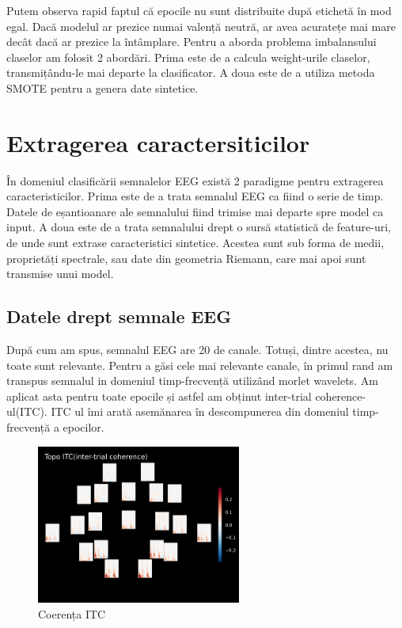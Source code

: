 Putem observa rapid faptul că epocile nu sunt distribuite după etichetă în mod egal. Dacă modelul ar prezice numai valență neutră, ar avea acuratețe mai mare decât dacă ar prezice la întâmplare. Pentru a aborda problema imbalansului claselor am folosit 2 abordări. Prima este de a calcula weight-urile claselor, transmițându-le mai departe la clasificator. A doua este de a utiliza metoda SMOTE\cite{imblearn} pentru a genera date sintetice.

\section{Extragerea caractersiticilor}
În domeniul clasificării semnalelor EEG există 2 paradigme pentru extragerea caracteristicilor. Prima este de a trata semnalul EEG ca fiind o serie de timp. Datele de eșantioanare ale semnalului fiind trimise mai departe spre model ca input. A doua este de a trata semnalului drept o sursă statistică de feature-uri, de unde sunt extrase caracteristici sintetice. Acestea sunt sub forma de medii, proprietăți spectrale, sau date din geometria Riemann, care mai apoi sunt transmise unui model.

\subsection{Datele drept semnale EEG}
După cum am spus, semnalul EEG are 20 de canale. Totuși, dintre acestea, nu toate sunt relevante. Pentru a găsi cele mai relevante canale, în primul rand am transpus semnalul in domeniul timp-frecvență utilizând morlet wavelets. Am aplicat asta pentru toate epocile și astfel am obținut inter-trial coherence-ul(ITC). ITC ul îmi arată asemănarea în descompunerea din domeniul timp-frecvență a epocilor.

\setlength{\abovecaptionskip}{0pt}
\setlength{\belowcaptionskip}{0pt}
\clearpage
\begin{figure}[h]
    \centering
    \includegraphics[width=0.6\textwidth]{images/itc_epochs.png}
    \caption{Coerența ITC}
    \label{fig:enter-label}
\end{figure}

